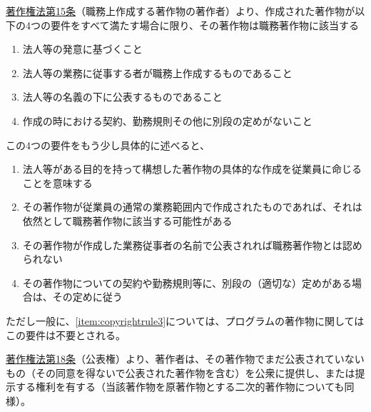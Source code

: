 \clearpage
\href{https://elaws.e-gov.go.jp/document?lawid=345AC0000000048\#Mp-At_15}{著作権法第15条}（職務上作成する著作物の著作者）より、作成された著作物が以下の4つの要件をすべて満たす場合に限り、その著作物は職務著作物に該当する
\begin{enumerate}[label=\Roman*, ref=\Roman*]
\item 法人等の発意に基づくこと
\item 法人等の業務に従事する者が職務上作成するものであること
\item\label{item:copyrightrule3} 法人等の名義の下に公表するものであること
\item 作成の時における契約、勤務規則その他に別段の定めがないこと
\end{enumerate}
この4つの要件をもう少し具体的に述べると、
\begin{enumerate}[label=\Roman*$'$]
\item 法人等がある目的を持って構想した著作物の具体的な作成を従業員に命じることを意味する
\item その著作物が従業員の通常の業務範囲内で作成されたものであれば、それは依然として職務著作物に該当する可能性がある
\item その著作物が作成した業務従事者の名前で公表されれば職務著作物とは認められない
\item その著作物についての契約や勤務規則等に、別段の（適切な）定めがある場合は、その定めに従う
\end{enumerate}
ただし一般に、\ref{item:copyrightrule3}{}については、プログラムの著作物に関してはこの要件は不要とされる。



\clearpage
\href{https://elaws.e-gov.go.jp/document?lawid=345AC0000000048\#Mp-At_18}{著作権法第18条}（公表権）\cite{eGovCopyrightLaw}より、著作者は、その著作物でまだ公表されていないもの（その同意を得ないで公表された著作物を含む）を公衆に提供し、または提示する権利を有する（当該著作物を原著作物とする二次的著作物についても同様）。


